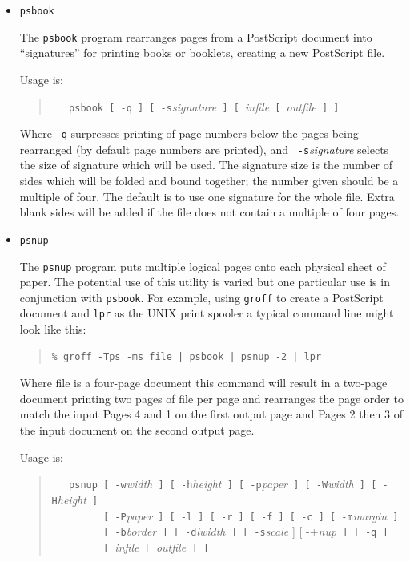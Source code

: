 \documentclass[twoside,11pt]{article}
\begin{document}
\begin{itemize}

\item {\tt psbook}

The {\tt psbook} program rearranges pages from a PostScript document
into ``signatures'' for printing books or booklets, creating a new
PostScript file.

Usage is:

\begin{quote}
\verb+   psbook [ -q ] [ -s+{\em signature}\verb+ ] [ +{\em infile}\verb+ [ +{\em outfile}\verb+ ] ]+
\end{quote}

Where {\tt -q} surpresses printing of page numbers below the pages
being rearranged (by default page numbers are printed), and {\tt
-s}{\em signature} selects the size of signature which will be used.
The signature size is the number of sides which will be folded and
bound together; the number given should be a multiple of four. The
default is to use one signature for the whole file. Extra blank sides
will be added if the file does not contain a multiple of four pages.

\item {\tt psnup}

The {\tt psnup} program puts multiple logical pages onto each physical
sheet of paper. The potential use of this utility is varied but one
particular use is in conjunction with {\tt psbook}. For example, using
{\tt groff} to create a PostScript document and {\tt lpr} as the UNIX
print spooler a typical command line might look like this:

\small
\begin{quote}
\begin{verbatim}
% groff -Tps -ms file | psbook | psnup -2 | lpr
\end{verbatim}
\end{quote}
\normalsize

Where file is a four-page document this command will result in a
two-page document printing two pages of file per page and rearranges
the page order to match the input Pages 4 and 1 on the first output
page and Pages 2 then 3 of the input document on the second output
page.

Usage is:

\begin{quote}
\verb+   psnup [ -w+{\em width}\verb+ ] [ -h+{\em height}\verb+ ] [ -p+{\em paper}\verb+ ] [ -W+{\em width}\verb+ ] [ -H+{\em height}\verb+ ]+\\
\verb+         [ -P+{\em paper}\verb+ ] [ -l ] [ -r ] [ -f ] [ -c ] [ -m+{\em margin}\verb+ ]+\\
\verb+         [ -b+{\em border}\verb+ ] [ -d+{\em lwidth}\verb+ ] [ -s+{\em scale} ] [ -+{\em nup}\verb+ ] [ -q ]+\\
\verb+         [ +{\em infile}\verb+ [ +{\em outfile}\verb+ ] ]+
\end{quote}


\end{itemize}
\end{document}
